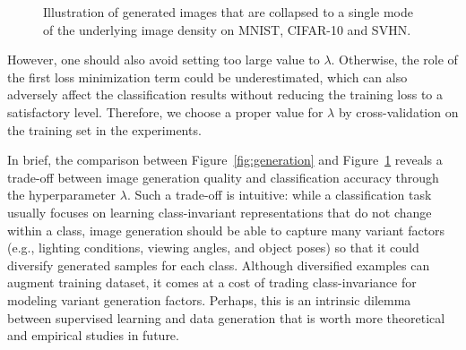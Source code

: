 \begin{figure}[t]
{\begin{minipage}{0.28\linewidth}
\begin{center}
\end{center}
\end{minipage}}\hspace{4mm}
   \caption{Illustration of generated images that are collapsed to a single mode of the underlying image density on MNIST, CIFAR-10 and SVHN.}\label{fig:collapse}
\end{figure}

However, one should also avoid setting too large value to $\lambda$.  Otherwise, the role of the first loss minimization term could be underestimated, which can also adversely affect the classification results without reducing the training loss to a satisfactory level.  Therefore, we choose a proper value for $\lambda$ by cross-validation on the training set in the experiments.


In brief, the comparison between Figure~\ref{fig:generation} and Figure~\ref{fig:collapse} reveals a trade-off between image generation quality and classification accuracy through the hyperparameter $\lambda$. Such a trade-off is intuitive: while a classification task usually focuses on learning class-invariant representations that do not change within a class, image generation should be able to capture many variant factors (e.g., lighting conditions, viewing angles, and object poses) so that it could diversify generated samples for each class. Although diversified examples can augment training dataset, it comes at a cost of trading class-invariance for modeling variant generation factors. Perhaps, this is an intrinsic dilemma between supervised learning and data generation that is worth more theoretical and empirical studies in future.

